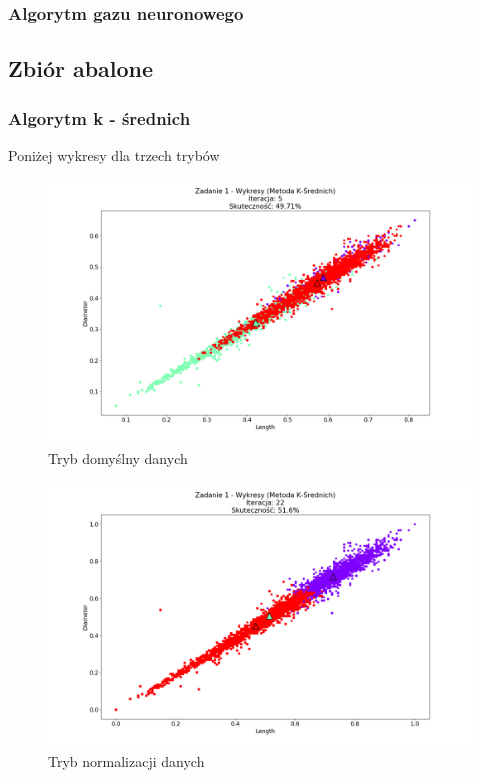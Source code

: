 \documentclass{classrep}
\begin{document}
{{		\subsubsection{Algorytm gazu neuronowego}
		{

		}
	}
	\subsection{Zbiór abalone}
	{
		\subsubsection{Algorytm k - średnich}
		{
			Poniżej wykresy dla trzech trybów
				\begin{figure}[!htbp]
					\centering
					\includegraphics[width=\textwidth,width=95mm]{wykresy/plot_k_meansAbaloneDefault.png}
					\caption{Tryb domyślny danych}
				\end{figure}
			
				\begin{figure}[!htbp]
					\centering
					\includegraphics[width=\textwidth,width=95mm]{wykresy/plot_k_meansAbaloneNormalised.png}
					\caption{Tryb normalizacji danych}
				\end{figure}
		
}}}
\end{document}
